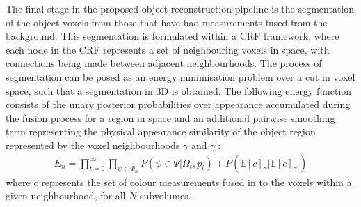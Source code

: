 The final stage in the proposed object reconstruction pipeline is the segmentation of the object voxels from those that have had measurements fused 
from the background. This segmentation is formulated within a CRF framework, where each node in the CRF represents a set of neighbouring voxels in space, 
with connections being made between adjacent neighbourhoods. The process of segmentation can be posed as an energy minimisation problem over a cut in voxel space, 
such that a segmentation in 3D is obtained. The following energy function consists of the unary posterior probabilities over appearance accumulated during the fusion 
process for a region in space and an additional pairwise smoothing term representing the physical appearance similarity of the object region represented by the voxel 
neighbourhoods $\gamma$ and $\gamma^{'}$:
\begin{equation}
\begin{split}
E_{n} = \prod_{t=0}^{\infty} \prod_{\psi \in \Phi_{n}} P(\psi \in \Psi | \Omega_{t}, p_{t}) + P(\mathbb{E}[c]_{\gamma} | \mathbb{E}[c]_{\gamma^{'}})
\end{split}
\end{equation}
where $c$ represents the set of colour measurements fused in to the voxels within a given neighbourhood, for all $N$ subvolumes.

